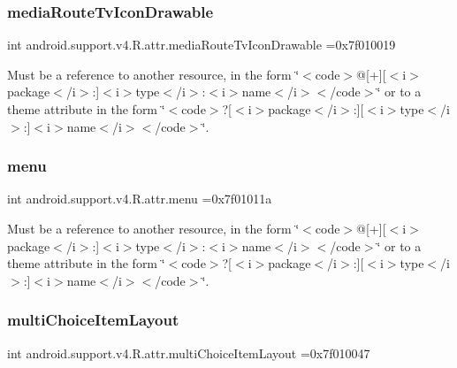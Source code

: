 \subsubsection{\texorpdfstring{media\+Route\+Tv\+Icon\+Drawable}{mediaRouteTvIconDrawable}}
{\footnotesize\ttfamily int android.\+support.\+v4.\+R.\+attr.\+media\+Route\+Tv\+Icon\+Drawable =0x7f010019\hspace{0.3cm}{\ttfamily [static]}}

Must be a reference to another resource, in the form \char`\"{}$<$code$>$@\mbox{[}+\mbox{]}\mbox{[}$<$i$>$package$<$/i$>$\+:\mbox{]}$<$i$>$type$<$/i$>$\+:$<$i$>$name$<$/i$>$$<$/code$>$\char`\"{} or to a theme attribute in the form \char`\"{}$<$code$>$?\mbox{[}$<$i$>$package$<$/i$>$\+:\mbox{]}\mbox{[}$<$i$>$type$<$/i$>$\+:\mbox{]}$<$i$>$name$<$/i$>$$<$/code$>$\char`\"{}. \mbox{\label{classandroid_1_1support_1_1v4_1_1R_1_1attr_a116926a875584a4fd631fc2f1113af9e}} 
\subsubsection{\texorpdfstring{menu}{menu}}
{\footnotesize\ttfamily int android.\+support.\+v4.\+R.\+attr.\+menu =0x7f01011a\hspace{0.3cm}{\ttfamily [static]}}

Must be a reference to another resource, in the form \char`\"{}$<$code$>$@\mbox{[}+\mbox{]}\mbox{[}$<$i$>$package$<$/i$>$\+:\mbox{]}$<$i$>$type$<$/i$>$\+:$<$i$>$name$<$/i$>$$<$/code$>$\char`\"{} or to a theme attribute in the form \char`\"{}$<$code$>$?\mbox{[}$<$i$>$package$<$/i$>$\+:\mbox{]}\mbox{[}$<$i$>$type$<$/i$>$\+:\mbox{]}$<$i$>$name$<$/i$>$$<$/code$>$\char`\"{}. \mbox{\label{classandroid_1_1support_1_1v4_1_1R_1_1attr_a3ae545489edf2089f9aeb66fc5c69707}} 
\subsubsection{\texorpdfstring{multi\+Choice\+Item\+Layout}{multiChoiceItemLayout}}
{\footnotesize\ttfamily int android.\+support.\+v4.\+R.\+attr.\+multi\+Choice\+Item\+Layout =0x7f010047\hspace{0.3cm}{\ttfamily [static]}}

